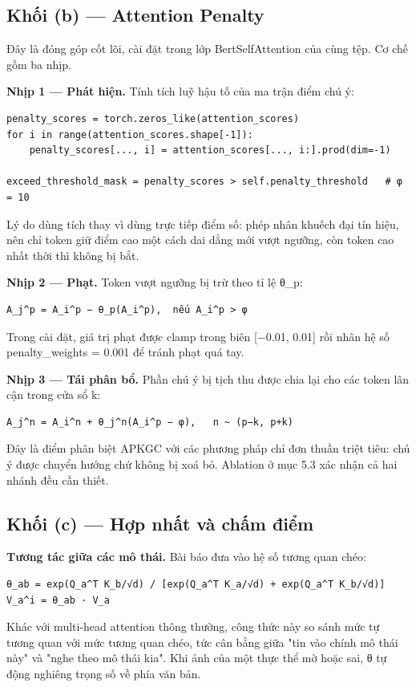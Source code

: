 \documentclass[11pt,a4paper]{article}
\newcommand{\code}[1]{{\ttfamily\small\color{codetext}#1}}
\begin{document}
\subsection{Khối (b) --- Attention Penalty}
Đây là đóng góp cốt lõi, cài đặt trong lớp \code{BertSelfAttention} của cùng tệp. Cơ chế gồm ba nhịp.

\textbf{Nhịp 1 --- Phát hiện.} Tính tích luỹ hậu tố của ma trận điểm chú ý:

\begin{lstlisting}
penalty_scores = torch.zeros_like(attention_scores)
for i in range(attention_scores.shape[-1]):
    penalty_scores[..., i] = attention_scores[..., i:].prod(dim=-1)

exceed_threshold_mask = penalty_scores > self.penalty_threshold   # φ = 10
\end{lstlisting}
Lý do dùng tích thay vì dùng trực tiếp điểm số: phép nhân khuếch đại tín hiệu, nên chỉ token giữ điểm cao một cách dai dẳng mới vượt ngưỡng, còn token cao nhất thời thì không bị bắt.

\textbf{Nhịp 2 --- Phạt.} Token vượt ngưỡng bị trừ theo tỉ lệ \code{θ\_p}:

\begin{lstlisting}
A_j^p = A_i^p − θ_p(A_i^p),  nếu A_i^p > φ
\end{lstlisting}
Trong cài đặt, giá trị phạt được \code{clamp} trong biên \code{[−0.01, 0.01]} rồi nhân hệ số \code{penalty\_weights = 0.001} để tránh phạt quá tay.

\textbf{Nhịp 3 --- Tái phân bổ.} Phần chú ý bị tịch thu được chia lại cho các token lân cận trong cửa sổ \code{k}:

\begin{lstlisting}
A_j^n = A_i^n + θ_j^n(A_i^p − φ),   n ~ (p−k, p+k)
\end{lstlisting}
Đây là điểm phân biệt APKGC với các phương pháp chỉ đơn thuần triệt tiêu: chú ý được chuyển hướng chứ không bị xoá bỏ. Ablation ở mục 5.3 xác nhận cả hai nhánh đều cần thiết.

\subsection{Khối (c) --- Hợp nhất và chấm điểm}
\textbf{Tương tác giữa các mô thái.} Bài báo đưa vào hệ số tương quan chéo:

\begin{lstlisting}
θ_ab = exp(Q_a^T K_b/√d) / [exp(Q_a^T K_a/√d) + exp(Q_a^T K_b/√d)]
V_a^i = θ_ab · V_a
\end{lstlisting}
Khác với multi-head attention thông thường, công thức này so sánh mức tự tương quan với mức tương quan chéo, tức cân bằng giữa "tin vào chính mô thái này" và "nghe theo mô thái kia". Khi ảnh của một thực thể mờ hoặc sai, \code{θ} tự động nghiêng trọng số về phía văn bản.
\end{document}
